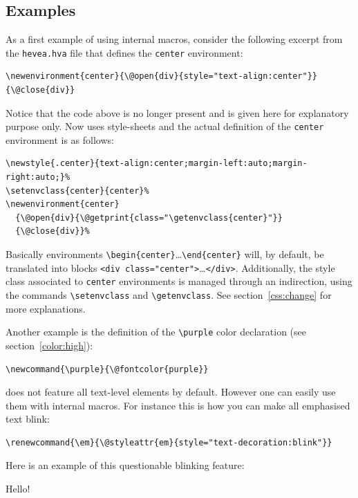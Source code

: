 \subsection{Examples}
As a first example of using internal macros, consider the following
excerpt from the \texttt{hevea.hva} file that
defines the \verb+center+ environment:
\begin{verbatim}
\newenvironment{center}{\@open{div}{style="text-align:center"}}{\@close{div}}
\end{verbatim}
%
Notice that the code above is no longer present and is given here
for explanatory purpose only.
Now \hevea{} uses style-sheets and the actual definition of the
\verb+center+ environment is as follows:
\begin{verbatim}
\newstyle{.center}{text-align:center;margin-left:auto;margin-right:auto;}%
\setenvclass{center}{center}%
\newenvironment{center}
  {\@open{div}{\@getprint{class="\getenvclass{center}"}}
  {\@close{div}}%
\end{verbatim}
Basically environments \verb+\begin{center}+\ldots\verb+\end{center}+ will, by
default, be translated into blocks
\verb+<div class="center">+\ldots\verb+</div>+.
Additionally, the style class associated to \verb+center+ environments
is managed through an indirection, using the
commands \verb+\setenvclass+ and \verb+\getenvclass+.
See section~\ref{css:change} for more explanations.

Another example is the definition of the \verb+\purple+
color declaration (see section~\ref{color:high}):
\begin{verbatim}
\newcommand{\purple}{\@fontcolor{purple}}
\end{verbatim}

\hevea{} does not feature all text-level elements by default.
However one can easily use them with internal macros.
For instance this is how you can make all emphasised text blink:
\begin{verbatim}
\renewcommand{\em}{\@styleattr{em}{style="text-decoration:blink"}}
\end{verbatim}
\begin{htmlonly}
Here is an example of this questionable blinking feature:
\begin{center}
{Hello!}
\end{center}
\end{htmlonly}

